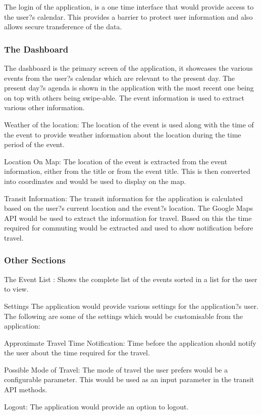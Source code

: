 \documentclass[12pt]{report}
\begin{document}
The login of the application, is a one time interface that would provide access to the user?s calendar. This provides a barrier to protect user information and also allows secure transference of the data.


\subsubsection{The Dashboard}
The dashboard is the primary screen of the application, it showcases the various events from the user?s calendar which are relevant to the present day. The present day?s agenda is shown in the application with the most recent one being on top with others being swipe-able. The event information is used to extract various other information.


Weather of the location: The location of the event is used along with the time of the event to provide weather information about the location during the time period of the event.


Location On Map: The location of the event is extracted from the event information, either from the title or from the event title. This is then converted into coordinates and would be used to display on the map.


Transit Information: The transit information for the application is calculated based on the user?s current location and the event?s location. The Google Maps API would be used to extract the information for travel. Based on this the time required for commuting would be extracted and used to show notification before travel.

\subsubsection{Other Sections}
The Event List : Shows the complete list of the events sorted in a list for the user to view.

Settings
The application would provide various settings for the application?s user. The following are some of the settings which would be customisable from the application:


Approximate Travel Time Notification: Time before the application should notify the user about the time required for the travel.


Possible Mode of Travel: The mode of travel the user prefers would be a configurable parameter. This would be used as an input parameter in the transit API methods.


Logout: The application would provide an option to logout.
\end{document}
